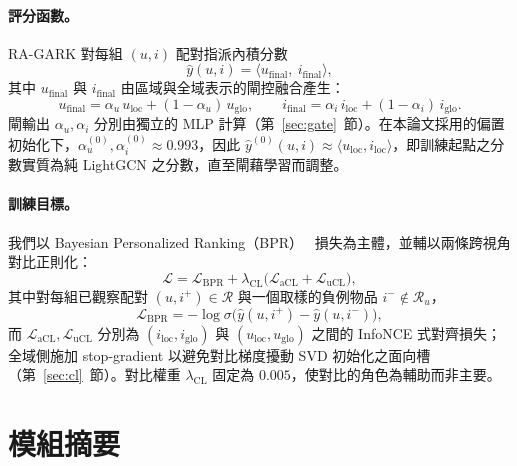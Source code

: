 \paragraph{評分函數。} RA-GARK 對每組 $(u, i)$ 配對指派內積分數
\begin{equation}
\label{eq:score-zh}
\hat{y}(u, i) = \langle u_{\mathrm{final}},\ i_{\mathrm{final}} \rangle,
\end{equation}
其中 $u_{\mathrm{final}}$ 與 $i_{\mathrm{final}}$ 由區域與全域表示的閘控融合產生：
\begin{equation}
\label{eq:fusion-zh}
u_{\mathrm{final}} = \alpha_u\, u_{\mathrm{loc}} + (1 - \alpha_u)\, u_{\mathrm{glo}}, \qquad
i_{\mathrm{final}} = \alpha_i\, i_{\mathrm{loc}} + (1 - \alpha_i)\, i_{\mathrm{glo}}.
\end{equation}
閘輸出 $\alpha_u, \alpha_i$ 分別由獨立的 MLP 計算（第~\ref{sec:gate}~節）。在本論文採用的偏置初始化下，$\alpha_u^{(0)}, \alpha_i^{(0)} \approx 0.993$，因此 $\hat{y}^{(0)}(u, i) \approx \langle u_{\mathrm{loc}}, i_{\mathrm{loc}} \rangle$，即訓練起點之分數實質為純 LightGCN 之分數，直至閘藉學習而調整。

\paragraph{訓練目標。} 我們以 Bayesian Personalized Ranking（BPR）~\cite{rendle2009bpr} 損失為主體，並輔以兩條跨視角對比正則化：
\begin{equation}
\label{eq:total-loss-zh}
\mathcal{L} = \mathcal{L}_{\mathrm{BPR}} + \lambda_{\mathrm{CL}} \bigl( \mathcal{L}_{\mathrm{aCL}} + \mathcal{L}_{\mathrm{uCL}} \bigr),
\end{equation}
其中對每組已觀察配對 $(u, i^+) \in \mathcal{R}$ 與一個取樣的負例物品 $i^- \notin \mathcal{R}_u$，
\begin{equation}
\label{eq:bpr-zh}
\mathcal{L}_{\mathrm{BPR}} = - \log \sigma\bigl( \hat{y}(u, i^+) - \hat{y}(u, i^-) \bigr),
\end{equation}
而 $\mathcal{L}_{\mathrm{aCL}}, \mathcal{L}_{\mathrm{uCL}}$ 分別為 $(i_{\mathrm{loc}}, i_{\mathrm{glo}})$ 與 $(u_{\mathrm{loc}}, u_{\mathrm{glo}})$ 之間的 InfoNCE 式對齊損失；全域側施加 stop-gradient 以避免對比梯度擾動 SVD 初始化之面向槽（第~\ref{sec:cl}~節）。對比權重 $\lambda_{\mathrm{CL}}$ 固定為 $0.005$，使對比的角色為輔助而非主要。

\section{模組摘要}
\label{sec:approach-modules-zh}

